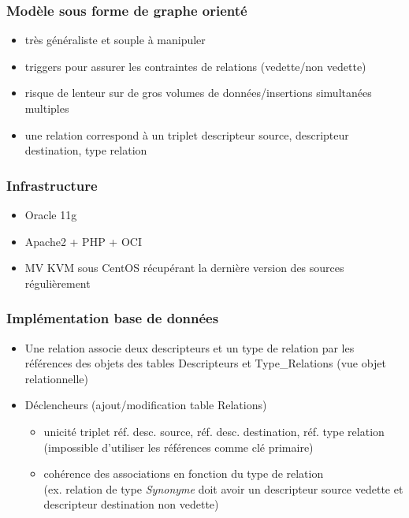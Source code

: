 \documentclass{beamer}
\begin{document}
\begin{frame}
\frametitle{Modèle sous forme de graphe orienté}
\begin{itemize}
\item très généraliste et souple à manipuler
\item triggers pour assurer les contraintes de relations (vedette/non vedette)
\item risque de lenteur sur de gros volumes de données/insertions simultanées multiples
\item une relation correspond à un triplet descripteur source, descripteur destination, type relation
\end{itemize}
\end{frame}


\begin{frame}
\frametitle{Infrastructure}
\begin{itemize}
\item Oracle 11g
\item Apache2 + PHP + OCI
\item MV KVM sous CentOS récupérant la dernière version des sources régulièrement
\end{itemize}
\end{frame}



\begin{frame}
\frametitle{Implémentation base de données}
\begin{itemize}
\item Une relation associe deux descripteurs et un type de relation par les références des objets des tables Descripteurs et Type\_Relations (vue objet relationnelle)
\item Déclencheurs (ajout/modification table Relations)
\begin{itemize}
\item unicité triplet réf. desc. source, réf. desc. destination, réf. type relation (impossible d'utiliser les références comme clé primaire)
\item cohérence des associations en fonction du type de relation\\ (ex. relation de type \emph{Synonyme} doit avoir un descripteur source vedette et descripteur destination non vedette)
\end{itemize}
\end{itemize} 
\end{frame}
\end{document}
